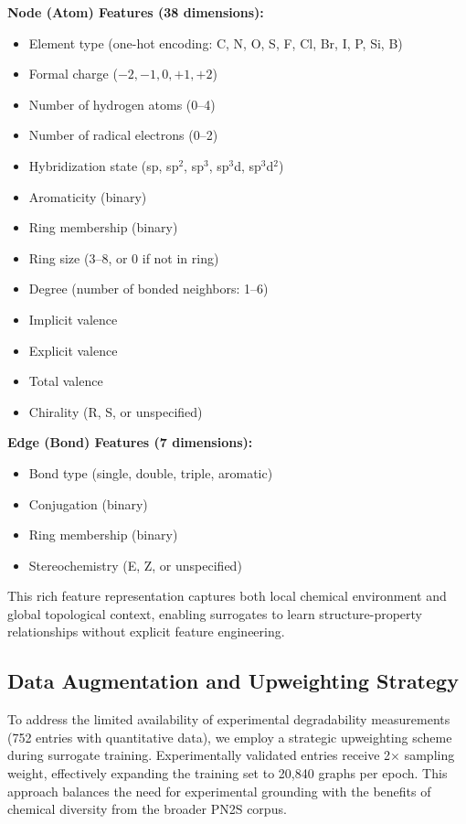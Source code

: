 \documentclass[twocolumn,10pt]{article}
\begin{document}
\textbf{Node (Atom) Features (38 dimensions):}
\begin{itemize}[noitemsep,leftmargin=*]
\item Element type (one-hot encoding: C, N, O, S, F, Cl, Br, I, P, Si, B)
\item Formal charge ($-2, -1, 0, +1, +2$)
\item Number of hydrogen atoms (0--4)
\item Number of radical electrons (0--2)
\item Hybridization state (sp, sp$^2$, sp$^3$, sp$^3$d, sp$^3$d$^2$)
\item Aromaticity (binary)
\item Ring membership (binary)
\item Ring size (3--8, or 0 if not in ring)
\item Degree (number of bonded neighbors: 1--6)
\item Implicit valence
\item Explicit valence
\item Total valence
\item Chirality (R, S, or unspecified)
\end{itemize}

\textbf{Edge (Bond) Features (7 dimensions):}
\begin{itemize}[noitemsep,leftmargin=*]
\item Bond type (single, double, triple, aromatic)
\item Conjugation (binary)
\item Ring membership (binary)
\item Stereochemistry (E, Z, or unspecified)
\end{itemize}

This rich feature representation captures both local chemical environment and global topological context, enabling surrogates to learn structure-property relationships without explicit feature engineering.

\subsection{Data Augmentation and Upweighting Strategy}

To address the limited availability of experimental degradability measurements (752 entries with quantitative data), we employ a strategic upweighting scheme during surrogate training. Experimentally validated entries receive 2$\times$ sampling weight, effectively expanding the training set to 20,840 graphs per epoch. This approach balances the need for experimental grounding with the benefits of chemical diversity from the broader PN2S corpus.
\end{document}
